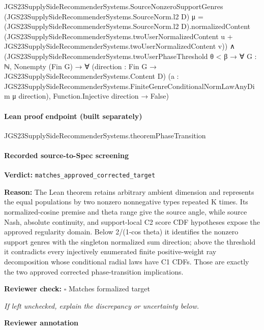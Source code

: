 \documentclass[10pt]{article}
\newcommand{\reviewerbox}{%
  \par\noindent\fbox{\parbox{0.96\linewidth}{\rule{0pt}{0.38in}}}\par
}
\newcommand{\reviewmatch}[1]{%
  \par\noindent\textbf{Reviewer check:} $\square$\; #1\par
  \noindent\emph{If left unchecked, explain the discrepancy or uncertainty below.}\par
}
\begin{document}
\begin{ReviewVerbatim}
    JGS23SupplySideRecommenderSystems.SourceNonzeroSupportGenres (JGS23SupplySideRecommenderSystems.SourceNorm.l2 D) μ =
      {(JGS23SupplySideRecommenderSystems.SourceNorm.l2 D).normalizedContent
          (JGS23SupplySideRecommenderSystems.twoUserNormalizedContent u +
            JGS23SupplySideRecommenderSystems.twoUserNormalizedContent v)}) ∧
  (JGS23SupplySideRecommenderSystems.twoUserPhaseThreshold θ < β →
    ∀ {G : ℕ},
      Nonempty (Fin G) →
        ∀ (direction : Fin G → JGS23SupplySideRecommenderSystems.Content D)
          (a : JGS23SupplySideRecommenderSystems.FiniteGenreConditionalNormLawAnyDim μ direction),
          Function.Injective direction → False)
\end{ReviewVerbatim}

\paragraph{Lean proof endpoint (built separately)}\begin{ReviewVerbatim}
JGS23SupplySideRecommenderSystems.theoremPhaseTransition
\end{ReviewVerbatim}

\paragraph{Recorded source-to-Spec screening}
\textbf{Verdict:} \texttt{matches\_approved\_corrected\_target}
\\
{\raggedright
\textbf{Reason:} The Lean theorem retains arbitrary ambient dimension and represents the equal populations by two nonzero nonnegative types repeated K times.\allowbreak{} Its normalized-\allowbreak{}cosine premise and theta range give the source angle, while source Nash, absolute continuity, and support-\allowbreak{}local C2 score CDF hypotheses expose the approved regularity domain.\allowbreak{} Below 2/\allowbreak{}(1-\allowbreak{}cos theta) it identifies the nonzero support genres with the singleton normalized sum direction;\allowbreak{} above the threshold it contradicts every injectively enumerated finite positive-\allowbreak{}weight ray decomposition whose conditional radial laws have C1 CDFs.\allowbreak{} Those are exactly the two approved corrected phase-\allowbreak{}transition implications.\allowbreak{}
\par}
\reviewmatch{Matches formalized target}
\noindent\textbf{Reviewer annotation}\par
\reviewerbox
\clearpage
\hypertarget{source-claim-bac13c5e10fbf065}{}
\end{document}
